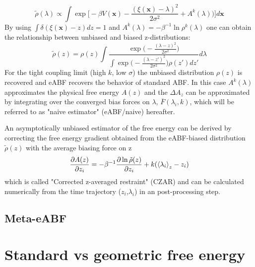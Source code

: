 \begin{equation}
  \tilde{\rho}(\lambda) \propto \int \exp \biggl[-\beta V(\textbf{x})-\frac{(\xi(\textbf{x})-\lambda)^2}{2\sigma^2} + A^{k}(\lambda) \biggr) \biggr] d\textbf{x}
\end{equation}
By using $\int \delta(\xi(\textbf{x})-z)dz=1$ and $A^k(\lambda)=-\beta^{-1}\ln\rho^k(\lambda)$ one can obtain the relationship between unbiased and biased z-distributions:
\begin{equation}
  \tilde{\rho}(z) =  \rho(z) \int \frac{\exp \bigl(-\frac{(\lambda-z)^2}{2\sigma^2}\bigr)}
  {\int \exp\bigl(-\frac{(\lambda-z')^2}{2\sigma^2}\bigr)\rho(z')dz'} d\lambda
\end{equation}
For the tight coupling limit (high $k$, low $\sigma$) the unbiased distribution $\rho(z)$ is recovered and eABF recovers the behavior of standard ABF.
In this case $A^k(\lambda)$  approximates the physical free energy $A(z)$ and the $\Delta A_{z}$ can be approximated by integrating over the converged bias forces on $\lambda$, $\overline{F}(\lambda_{i}, k)$, which will be referred to as "naive estimator" (eABF/naive) hereafter.

An asymptotically unbiased estimator of the free energy can be derived by correcting the free energy gradient obtained from the eABF-biased distribution $\tilde{\rho}(z)$ with the average biasing force on z
\begin{equation}
  \frac{\partial A(z)}{\partial z_i} = -\beta^{-1}\frac{\partial \ln \tilde{\rho}(z)}{\partial z_i} + k(\braket{\lambda_i}_{z}-z_{i})
\end{equation}
which is called "Corrected z-averaged restraint" (CZAR) and can be calculated numerically from the time trajectory ($z_i$,$\lambda_i$) in an post-processing step.\autocite{lesage2017smoothed}

\subsection{Meta-eABF}
\label{sec:meta-eABF}

\section{Standard vs geometric free energy}

